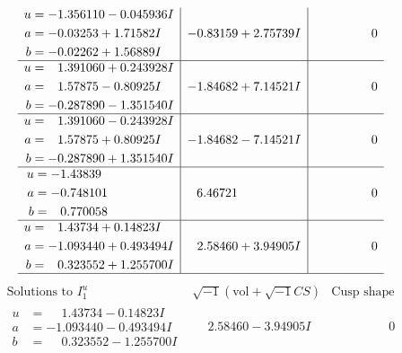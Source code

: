 \documentclass[1p]{elsarticle_modified}
\theoremstyle{definition}
\newcommand{\I}{\sqrt{-1}}
\begin{document}
$$\begin{array}{c|c|c}
\begin{aligned}
u &= -1.356110 - 0.045936 I \\
a &= -0.03253 + 1.71582 I \\
b &= -0.02262 + 1.56889 I\end{aligned}
 & -0.83159 + 2.75739 I & \phantom{-0.000000 } 0 \\ \hline\begin{aligned}
u &= \phantom{-}1.391060 + 0.243928 I \\
a &= \phantom{-}1.57875 - 0.80925 I \\
b &= -0.287890 - 1.351540 I\end{aligned}
 & -1.84682 + 7.14521 I & \phantom{-0.000000 } 0 \\ \hline\begin{aligned}
u &= \phantom{-}1.391060 - 0.243928 I \\
a &= \phantom{-}1.57875 + 0.80925 I \\
b &= -0.287890 + 1.351540 I\end{aligned}
 & -1.84682 - 7.14521 I & \phantom{-0.000000 } 0 \\ \hline\begin{aligned}
u &= -1.43839\phantom{ +0.000000I} \\
a &= -0.748101\phantom{ +0.000000I} \\
b &= \phantom{-}0.770058\phantom{ +0.000000I}\end{aligned}
 & \phantom{-}6.46721\phantom{ +0.000000I} & \phantom{-0.000000 } 0 \\ \hline\begin{aligned}
u &= \phantom{-}1.43734 + 0.14823 I \\
a &= -1.093440 + 0.493494 I \\
b &= \phantom{-}0.323552 + 1.255700 I\end{aligned}
 & \phantom{-}2.58460 + 3.94905 I & \phantom{-0.000000 } 0\\
 \hline 
 \end{array}$$\newpage$$\begin{array}{c|c|c}  
\text{Solutions to }I^u_{1}& \I (\text{vol} + \sqrt{-1}CS) & \text{Cusp shape}\\
 \hline 
\begin{aligned}
u &= \phantom{-}1.43734 - 0.14823 I \\
a &= -1.093440 - 0.493494 I \\
b &= \phantom{-}0.323552 - 1.255700 I\end{aligned}
 & \phantom{-}2.58460 - 3.94905 I & \phantom{-0.000000 } 0 \\ \hline\begin{aligned}

\end{aligned}
\end{array}$$
\end{document}
